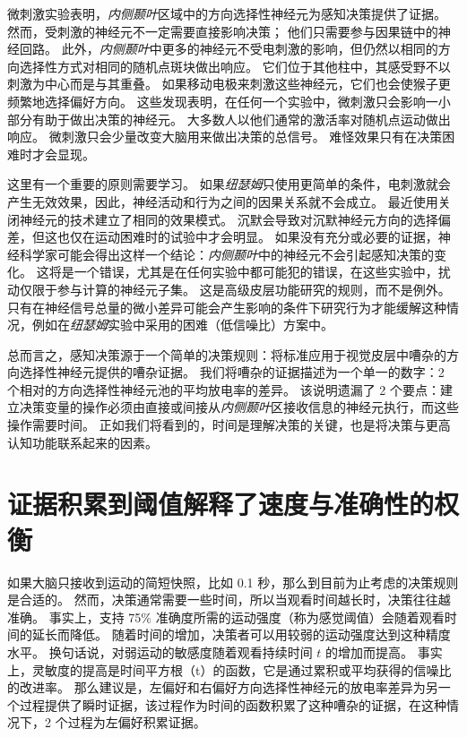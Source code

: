微刺激实验表明，\textit{内侧颞叶}区域中的方向选择性神经元为感知决策提供了证据。
然而，受刺激的神经元不一定需要直接影响决策；
他们只需要参与因果链中的神经回路。
此外，\textit{内侧颞叶}中更多的神经元不受电刺激的影响，但仍然以相同的方向选择性方式对相同的随机点斑块做出响应。
它们位于其他柱中，其感受野不以刺激为中心而是与其重叠。
如果移动电极来刺激这些神经元，它们也会使猴子更频繁地选择偏好方向。
这些发现表明，在任何一个实验中，微刺激只会影响一小部分有助于做出决策的神经元。
大多数人以他们通常的激活率对随机点运动做出响应。
微刺激只会少量改变大脑用来做出决策的总信号。
难怪效果只有在决策困难时才会显现。


这里有一个重要的原则需要学习。
如果\textit{纽瑟姆}只使用更简单的条件，电刺激就会产生无效效果，因此，神经活动和行为之间的因果关系就不会成立。
最近使用关闭神经元的技术建立了相同的效果模式。
沉默会导致对沉默神经元方向的选择偏差，但这也仅在运动困难时的试验中才会明显。
如果没有充分或必要的证据，神经科学家可能会得出这样一个结论：\textit{内侧颞叶}中的神经元不会引起感知决策的变化。
这将是一个错误，尤其是在任何实验中都可能犯的错误，在这些实验中，扰动仅限于参与计算的神经元子集。
这是高级皮层功能研究的规则，而不是例外。
只有在神经信号总量的微小差异可能会产生影响的条件下研究行为才能缓解这种情况，例如在\textit{纽瑟姆}实验中采用的困难（低信噪比）方案中。


总而言之，感知决策源于一个简单的决策规则：将标准应用于视觉皮层中嘈杂的方向选择性神经元提供的嘈杂证据。
我们将嘈杂的证据描述为一个单一的数字：2 个相对的方向选择性神经元池的平均放电率的差异。
该说明遗漏了 2 个要点：建立决策变量的操作必须由直接或间接从\textit{内侧颞叶}区接收信息的神经元执行，而这些操作需要时间。
正如我们将看到的，时间是理解决策的关键，也是将决策与更高认知功能联系起来的因素。



\section{证据积累到阈值解释了速度与准确性的权衡}

如果大脑只接收到运动的简短快照，比如 0.1 秒，那么到目前为止考虑的决策规则是合适的。
然而，决策通常需要一些时间，所以当观看时间越长时，决策往往越准确。
事实上，支持 75\% 准确度所需的运动强度（称为感觉阈值）会随着观看时间的延长而降低。
随着时间的增加，决策者可以用较弱的运动强度达到这种精度水平。
换句话说，对弱运动的敏感度随着观看持续时间 $ t $ 的增加而提高。
事实上，灵敏度的提高是时间平方根（t）的函数，它是通过累积或平均获得的信噪比的改进率。
那么建议是，左偏好和右偏好方向选择性神经元的放电率差异为另一个过程提供了瞬时证据，该过程作为时间的函数积累了这种嘈杂的证据，在这种情况下，2 个过程为左偏好积累证据。


